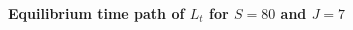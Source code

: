 \begin{spacing}{1.5}
    \begin{figure}[htb]\centering \captionsetup{width=4.0in}
      \caption{\label{FigLpathTPI}\textbf{Equilibrium time path of $L_t$ for $S=80$ and $J=7$}}
    \end{figure}

    

\end{spacing}
